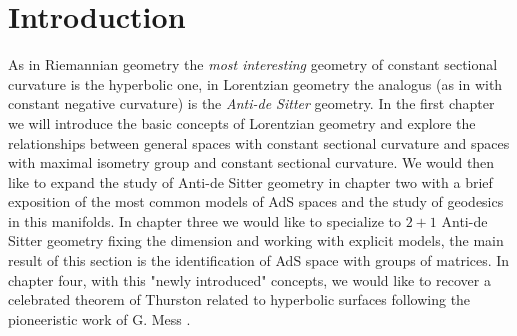 \chapter{Introduction}

As in Riemannian geometry the \textit{most interesting} geometry of constant sectional curvature is the hyperbolic one, in Lorentzian geometry the analogus (as in with constant negative curvature) is the \textit{Anti-de Sitter} geometry. In the first chapter we will introduce the basic concepts of Lorentzian geometry and explore the relationships between general spaces with constant sectional curvature and spaces with maximal isometry group and constant sectional curvature.
We would then like to expand the study of Anti-de Sitter geometry in chapter two with a brief exposition of the most common models of AdS spaces and the study of geodesics in this manifolds. 
In chapter three we would like to specialize to $2+1$ Anti-de Sitter geometry fixing the dimension and working with explicit models, the main result of this section is the identification of AdS space with groups of matrices. 
In chapter four, with this "newly introduced" concepts, we would like to recover a celebrated theorem of Thurston related to hyperbolic surfaces following the pioneeristic work of G. Mess \cite{Mess}.